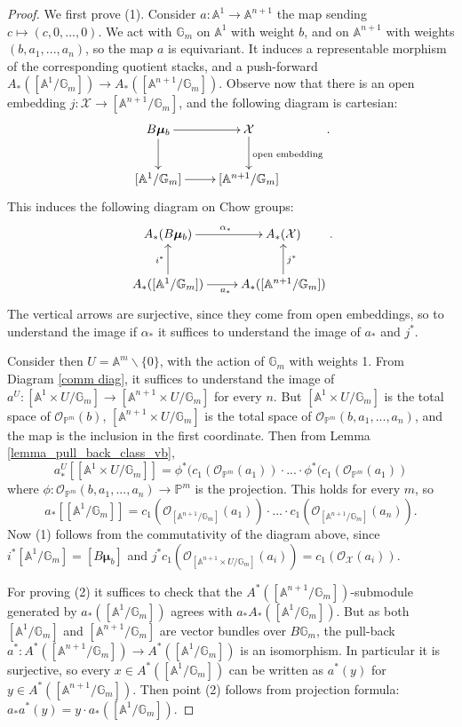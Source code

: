 \documentclass[11pt]{amsart}
\theoremstyle{definition}
\theoremstyle{remark}
\newcommand{\bP}{{\mathbb P}}
\newcommand{\bA}{{\mathbb A}}
\newcommand{\calO}{\mathcal O}
\newcommand{\calX}{\mathcal X}
\newcommand{\bmu}{\boldsymbol{\mu}}
\newcommand{\bG}{\mathbb{G}}
\begin{document}
\begin{proof}We first prove (1).
Consider $a:\mathbb{A}^1 \to \mathbb{A}^{n+1}$ the map sending $c\mapsto (c,0,...,0)$. We act with $\bG_m$ on $\mathbb{A}^1$ with weight $b$, and on $\mathbb{A}^{n+1}$ with weights $(b,a_1,...,a_n)$, so the map $a$ is equivariant. It induces a representable morphism of the corresponding quotient stacks, and a push-forward $A_*([\bA^1/\bG_m]) \to A_*([\bA^{n+1}/\bG_m])$.
Observe now that there is an open embedding $j: \calX\to [\bA^{n+1}/\bG_m]$,
and the following diagram is cartesian:
$$\xymatrix{B\bmu_b \ar[d]\ar[r] & \calX \ar[d]^{\text{open embedding}} \\ [\bA^1/\bG_m] \ar[r] & [\bA^{n+1}/\bG_m]}.$$
This induces the following diagram on Chow groups:
$$\xymatrix{A_*(B\bmu_b) \ar[r]^{\alpha_*}  & A_*(\calX)\\ A_*([\bA^1/\bG_m]) \ar[r]_{a_*} \ar[u]^{i^*}& A_*([\bA^{n+1}/\bG_m])\ar[u]_{j^*}}.$$
The vertical arrows are surjective, since they come from open embeddings, so to understand the image if $\alpha_*$ it suffices to understand the image of $a_*$ and $j^*$. 

 Consider then $U = \mathbb{A}^m\smallsetminus \{0\}$, with the action of $\mathbb{G}_m$ with weights 1. From Diagram \ref{comm diag}, it suffices to understand the image of $a^U:[\mathbb{A}^1\times U/\bG_m] \to [\mathbb{A}^{n+1}\times U/\bG_m]$ for every $n$. But
$[\mathbb{A}^1\times U/\bG_m] $ is the total space of $\calO_{\mathbb{P}^m}(b)$, $[\mathbb{A}^{n+1}\times U/\bG_m] $ is the total space of $\calO_{\mathbb{P}^m}(b,a_1,...,a_n)$, and the map is the inclusion in the first coordinate. Then
from
Lemma \ref{lemma_pull_back_class_vb}, $$a^U_*[[\mathbb{A}^1\times U/\bG_m]] = \phi^*(c_1(\calO_{\bP^m}(a_1))\cdot ... \cdot \phi^*(c_1(\calO_{\bP^m}(a_1))$$ where $\phi: \calO_{\mathbb{P}^m}(b,a_1,...,a_n) \to \bP^m$ is the projection. This holds for every $m$, so $$a_*[[\mathbb{A}^1/\bG_m]] = c_1(\calO_{[\mathbb{A}^{n+1}/\bG_m]}(a_1))\cdot ... \cdot c_1(\calO_{[\mathbb{A}^{n+1}/\bG_m]}(a_n)).$$Now (1) follows from the commutativity of the diagram above, since $i^*[\mathbb{A}^1/\bG_m] = [B\bmu_b]$ and $j^*c_1(\calO_{[\mathbb{A}^{n+1}\times U/\bG_m]}(a_i)) = c_1(\calO_{\calX}(a_i))$.

For proving (2) it suffices to check that the $A^*([\bA^{n+1}/\bG_m])$-submodule generated by $a_*([\bA^{1}/\bG_m])$ agrees with $a_*A_*([\bA^{1}/\bG_m])$. But as both $[\bA^{1}/\bG_m]$ and $[\bA^{n+1}/\bG_m]$ are vector bundles over $B\bG_m$, the pull-back $a^*:A^*([\bA^{n+1}/\bG_m])\to A^*([\bA^{1}/\bG_m])$ is an isomorphism. In particular it is surjective, so every $x\in A^*([\bA^{1}/\bG_m])$ can be written as $a^*(y)$ for $y\in A^*([\bA^{n+1}/\bG_m])$. Then point (2) follows from projection formula: $a_*a^*(y) = y\cdot a_*([\bA^{1}/\bG_m])$. 
\end{proof}
\end{document}
